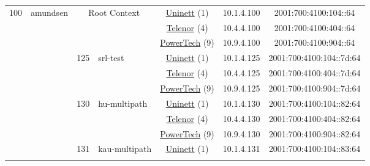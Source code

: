\begin{small}
\begin{center}
\begin{longtable}{|c|c|c|c|c|c|c|c|}
 \multirow{36}{*}{\tiny{100}} & \multicolumn{1}{|l|}{\multirow{36}{*}{\tiny{amundsen}}} & \multicolumn{2}{|c|}{\multirow{3}{*}{\tiny{Root Context}}} & \multicolumn{2}{|c|}{\tiny{\href{https://www.uninett.no}{Uninett} (1)}} & \tiny{10.1.4.100} & \tiny{2001:700:4100:104::64} \\* \cline{5-5}\cline{6-6}\cline{7-7}\cline{8-8}
  &  & \multicolumn{2}{|c|}{} & \multicolumn{2}{|c|}{\tiny{\href{https://www.telenor.no}{Telenor} (4)}} & \tiny{10.4.4.100} & \tiny{2001:700:4100:404::64} \\* \cline{5-5}\cline{6-6}\cline{7-7}\cline{8-8}
  &  & \multicolumn{2}{|c|}{} & \multicolumn{2}{|c|}{\tiny{\href{http://www.powertech.no}{PowerTech} (9)}} & \tiny{10.9.4.100} & \tiny{2001:700:4100:904::64} \\* \cline{3-3}\cline{4-4}\cline{5-5}\cline{6-6}\cline{7-7}\cline{8-8}
  &  & \multirow{3}{*}{\tiny{125}} & \multicolumn{1}{|l|}{\multirow{3}{*}{\tiny{srl-test}}} & \multicolumn{2}{|c|}{\tiny{\href{https://www.uninett.no}{Uninett} (1)}} & \tiny{10.1.4.125} & \tiny{2001:700:4100:104::7d:64} \\* \cline{5-5}\cline{6-6}\cline{7-7}\cline{8-8}
  &  &  &  & \multicolumn{2}{|c|}{\tiny{\href{https://www.telenor.no}{Telenor} (4)}} & \tiny{10.4.4.125} & \tiny{2001:700:4100:404::7d:64} \\* \cline{5-5}\cline{6-6}\cline{7-7}\cline{8-8}
  &  &  &  & \multicolumn{2}{|c|}{\tiny{\href{http://www.powertech.no}{PowerTech} (9)}} & \tiny{10.9.4.125} & \tiny{2001:700:4100:904::7d:64} \\* \cline{3-3}\cline{4-4}\cline{5-5}\cline{6-6}\cline{7-7}\cline{8-8}
  &  & \multirow{3}{*}{\tiny{130}} & \multicolumn{1}{|l|}{\multirow{3}{*}{\tiny{hu-multipath}}} & \multicolumn{2}{|c|}{\tiny{\href{https://www.uninett.no}{Uninett} (1)}} & \tiny{10.1.4.130} & \tiny{2001:700:4100:104::82:64} \\* \cline{5-5}\cline{6-6}\cline{7-7}\cline{8-8}
  &  &  &  & \multicolumn{2}{|c|}{\tiny{\href{https://www.telenor.no}{Telenor} (4)}} & \tiny{10.4.4.130} & \tiny{2001:700:4100:404::82:64} \\* \cline{5-5}\cline{6-6}\cline{7-7}\cline{8-8}
  &  &  &  & \multicolumn{2}{|c|}{\tiny{\href{http://www.powertech.no}{PowerTech} (9)}} & \tiny{10.9.4.130} & \tiny{2001:700:4100:904::82:64} \\* \cline{3-3}\cline{4-4}\cline{5-5}\cline{6-6}\cline{7-7}\cline{8-8}
  &  & \multirow{3}{*}{\tiny{131}} & \multicolumn{1}{|l|}{\multirow{3}{*}{\tiny{kau-multipath}}} & \multicolumn{2}{|c|}{\tiny{\href{https://www.uninett.no}{Uninett} (1)}} & \tiny{10.1.4.131} & \tiny{2001:700:4100:104::83:64} \\* \cline{5-5}\cline{6-6}\cline{7-7}\cline{8-8}

\end{longtable}
\end{center}
\end{small}

